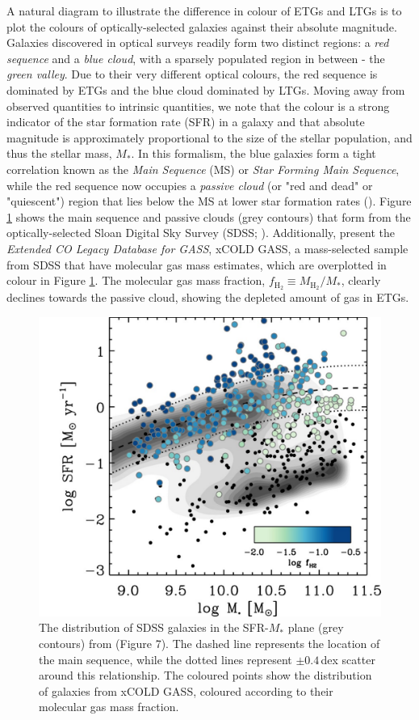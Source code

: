A natural diagram to illustrate the difference in colour of ETGs and LTGs is to plot the colours of optically-selected galaxies against their absolute magnitude. Galaxies discovered in optical surveys readily form two distinct regions: a \textit{red sequence} and a \textit{blue cloud}, with a sparsely populated region in between - the \textit{green valley}. Due to their very different optical colours, the red sequence is dominated by ETGs and the blue cloud dominated by LTGs. Moving away from observed quantities to intrinsic quantities, we note that the colour is a strong indicator of the star formation rate (SFR) in a galaxy and that absolute magnitude is approximately proportional to the size of the stellar population, and thus the stellar mass, $M_*$. In this formalism, the blue galaxies form a tight correlation known as the \textit{Main Sequence} (MS) or \textit{Star Forming Main Sequence}, while the red sequence now occupies a \textit{passive cloud} (or "red and dead" or "quiescent") region that lies below the MS at lower star formation rates (\citealt{Noeske_2007, Daddi_2007, Elbaz_2007, Rodighiero_2011}). Figure \ref{fig:star_forming_main_sequence} shows the main sequence and passive clouds (grey contours) that form from the optically-selected Sloan Digital Sky Survey (SDSS; \citealt{York_2000}). Additionally, \citealt{Saintonge_2017} present the \textit{Extended CO Legacy Database for GASS}, xCOLD GASS, a mass-selected sample from SDSS that have molecular gas mass estimates, which are overplotted in colour in Figure \ref{fig:star_forming_main_sequence}. The molecular gas mass fraction, $f_{\textrm{H}_2} \equiv M_{\textrm{H}_2}/M_*$, clearly declines towards the passive cloud, showing the depleted amount of gas in ETGs.

\begin{figure}
    \centering
	\includegraphics[width=0.8\columnwidth]{Figures/saintonge_ms.pdf}
	\caption[The distribution of SDSS galaxies in the SFR-$M_*$ plane]{The distribution of SDSS galaxies in the SFR-$M_*$ plane (grey contours) from \citealt{Saintonge_2017} (Figure 7). The dashed line represents the location of the main sequence, while the dotted lines represent $\pm0.4\,$dex scatter around this relationship. The coloured points show the distribution of galaxies from xCOLD GASS, coloured according to their molecular gas mass fraction.}
	\label{fig:star_forming_main_sequence}
\end{figure}

